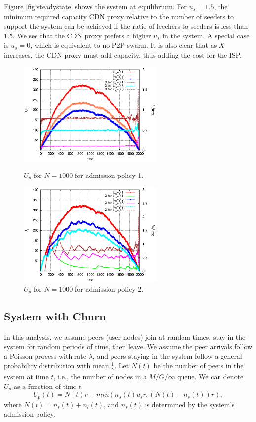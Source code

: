 \documentclass[paper]{ieice}
\begin{document}
Figure \ref{fig:steadystate} shows the system at equilibrium.
For $u_s=1.5$, the minimum required capacity CDN proxy relative to the number of seeders to support the system can be achieved if the ratio of leechers to seeders is less than $1.5$.
We see that the CDN proxy prefers a higher $u_s$ in the system.
A special case is $u_s = 0$, which is equivalent to no P2P swarm.
It is also clear that as $X$ increases, the CDN proxy must add capacity, thus adding the cost for the ISP.

\begin{figure}[thb]
\begin{minipage}[b]{0.4\linewidth}
\centering
\includegraphics[width=2.8in]{graphs/U_p_n_1000.eps}
\caption{$U_p$ for $N=1000$ for admission policy 1.}
\label{fig:U_p_1000_1}
\end{minipage}
\hspace{0.5cm}
\begin{minipage}[b]{0.5\linewidth}
\centering
\includegraphics[width=2.8in]{graphs/U_p_n_1000_admi.eps}
\caption{$U_p$ for $N=1000$ for admission policy 2.}
\label{fig:U_p_1000_2}
\end{minipage}
\end{figure}

\subsection{System with Churn}\label{sec:stablesystemwithchurn}

In this analysis, we assume peers (user nodes) join at random times, stay in the system for random periods of time, then leave.
We assume the peer arrivals follow a Poisson process with rate $\lambda$, and peers staying in the system follow a general probability distribution with mean $\frac{1}{\gamma}$.
Let $N(t)$ be the number of peers in the system at time $t$, i.e., the
number of nodes in a $M/G/\infty$ queue.  We can denote $U_p$ as a function of time $t$
\begin{equation}
        U_p(t) = N(t)r - min(n_s(t) u_s r, (N(t) - n_s(t))r),
\end{equation}
where $N(t) = n_s(t) + n_l(t)$, and $n_s(t)$ is determined by the system's admission policy.
\end{document}

